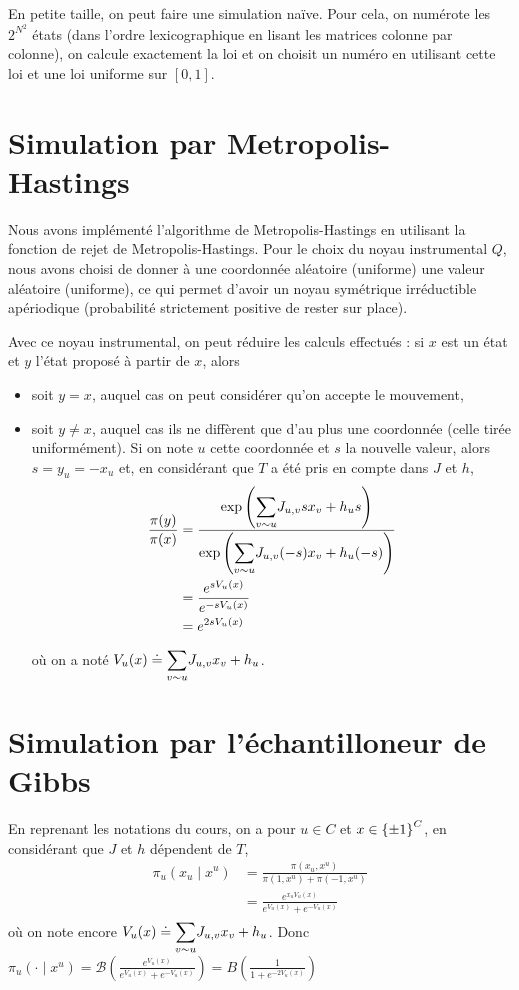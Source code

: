 \documentclass[a4paper,11pt]{article}
\begin{document}
En petite taille, on peut faire une simulation naïve. Pour cela, on numérote les $2^{N^2}$ états (dans l'ordre lexicographique en lisant les matrices colonne par colonne), on calcule exactement la loi et on choisit un numéro en utilisant cette loi et une loi uniforme sur $[0,1]$.

\section{Simulation par Metropolis-Hastings}\label{sec:MH}

Nous avons implémenté l'algorithme de Metropolis-Hastings en utilisant la fonction de rejet de Metropolis-Hastings. Pour le choix du noyau instrumental $Q$, nous avons choisi de donner à une coordonnée aléatoire (uniforme) une valeur aléatoire (uniforme), ce qui permet d'avoir un noyau symétrique irréductible apériodique (probabilité strictement positive de rester sur place).

Avec ce noyau instrumental, on peut réduire les calculs effectués : si $x$ est un état et $y$ l'état proposé à partir de $x$, alors
\begin{itemize}
	\item soit $y = x$, auquel cas on peut considérer qu'on accepte le mouvement,
	\item soit $y \neq x$, auquel cas ils ne diffèrent que d'au plus une coordonnée (celle tirée uniformément). Si on note $u$ cette coordonnée et $s$ la nouvelle valeur, alors $s = y_u = - x_u$ et, en considérant que $T$ a été pris en compte dans $J$ et $h$,
	\begin{align*}
	\frac{\pi(y)}{\pi(x)}
	&= \frac{\exp \left( \displaystyle{\sum_{v \sim u}^{}} J_{u,v} s x_{v} + h_{u} s \right)}{\exp \left( \displaystyle{\sum_{v \sim u}^{}} J_{u,v} (-s) x_{v} + h_{u} (-s) \right)}\\
	&= \frac{e^{s V_u(x)}}{e^{-s V_u(x)}}\\
	&= e^{2 s V_u(x)}
	\end{align*}
	où on a noté $V_u(x) \doteq \displaystyle{\sum_{v \sim u}^{}} J_{u,v} x_v + h_u$.
\end{itemize}

\section{Simulation par l'échantilloneur de Gibbs}

En reprenant les notations du cours, on a pour $u \in C$ et $x \in \left\lbrace \pm 1 \right\rbrace^C$, en considérant que $J$ et $h$ dépendent de $T$,
\begin{align*}
\pi_u(x_u \mid x^u)
&= \frac{\pi(x_u,x^u)}{\pi(1,x^u) + \pi(-1,x^u)}\\
&= \frac{e^{x_u V_u(x)}}{e^{V_u(x)} + e^{-V_u(x)}}
\end{align*}
où on note encore $V_u(x) \doteq \displaystyle{\sum_{v \sim u}^{}} J_{u,v} x_v + h_u$. Donc $\pi_u(\cdot \mid x^u) = \mathcal B(\frac{e^{V_u(x)}}{e^{V_u(x)} + e^{-V_u(x)}}) = B(\frac{1}{1 + e^{-2V_u(x)}})$
\end{document}
